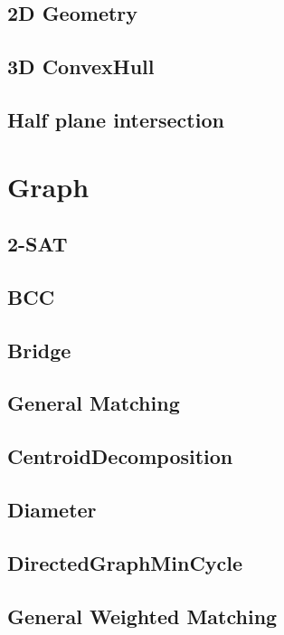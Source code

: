 \subsection{2D Geometry}

\subsection{3D ConvexHull}

\subsection{Half plane intersection}




\section{Graph}
\subsection{2-SAT}

\subsection{BCC}

\subsection{Bridge}

\subsection{General Matching}

\subsection{CentroidDecomposition}

\subsection{Diameter}

\subsection{DirectedGraphMinCycle}

\subsection{General Weighted Matching}

